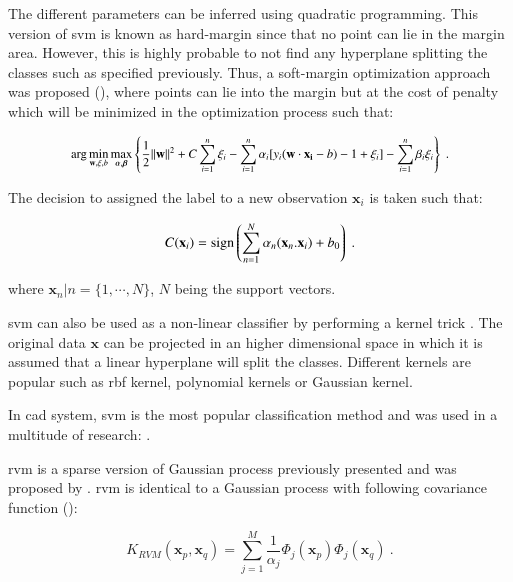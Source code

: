 \begin{enumerate}[leftmargin=*]
The different parameters can be inferred using quadratic programming. This version of \ac{svm} is known as hard-margin since that no point can lie in the margin area. However, this is highly probable to not find any hyperplane splitting the classes such as specified previously. Thus, a soft-margin optimization approach was proposed (\cite{Cortes1995}), where points can lie into the margin but at the cost of penalty which will be minimized in the optimization process such that:

\begin{equation}
\small
\arg\min_{\mathbf{w},\mathbf{\xi}, b } \max_{\boldsymbol{\alpha},\boldsymbol{\beta} } \left\{ \frac{1}{2}\|\mathbf{w}\|^2+C \sum_{i=1}^n \xi_i - \sum_{i=1}^{n}{\alpha_i[y_i(\mathbf{w}\cdot \mathbf{x_i} - b) -1 + \xi_i]} - \sum_{i=1}^{n} \beta_i \xi_i \right\} \ .
\end{equation}

The decision to assigned the label to a new observation $\mathbf{x}_i$ is taken such that:

\begin{equation}
	C(\mathbf{x}_i) = \operatorname*{sign} \left( \sum_{n=1}^{N} \alpha_n (\mathbf{x}_n . \mathbf{x}_i) + b_0 \right) \ .
	\label{eq:svmdec} 
\end{equation}

\noindent where $\mathbf{x}_n|n=\{1,\cdots,N\}$, $N$ being the support vectors.

\ac{svm} can also be used as a non-linear classifier by performing a kernel trick \cite{Boser1992}. The original data $\mathbf{x}$ can be projected in an higher dimensional space in which it is assumed that a linear hyperplane will split the classes. Different kernels are popular such as \ac{rbf} kernel, polynomial kernels or Gaussian kernel.

In \ac{cad} system, \ac{svm} is the most popular classification method and was used in a multitude of research: \cite{Artan2009,Artan2010,Chan2003,Kelm2007,Litjens2011,Litjens2012,Liu2013,Lopes2011,Niaf2011,Niaf2012,Ozer2009,Ozer2010,Parfait2012,Peng2013,Sung2011,Tiwari2012,Vos2008,Vos2008a,Vos2010,Vos2012}.

\Acf{rvm} is a sparse version of Gaussian process previously presented and was proposed by \cite{Tipping2001}. \ac{rvm} is identical to a Gaussian process with following covariance function (\cite{Quinonero-Candela2002}):

\begin{equation}
	K_{RVM}(\mathbf{x}_p,\mathbf{x}_q) = \sum_{j=1}^{M} \frac{1}{\alpha_j} \Phi_j ( \mathbf{x}_p ) \Phi_j ( \mathbf{x}_q ) \ . 
 	\label{eq:rvm}
\end{equation}


\end{enumerate}
